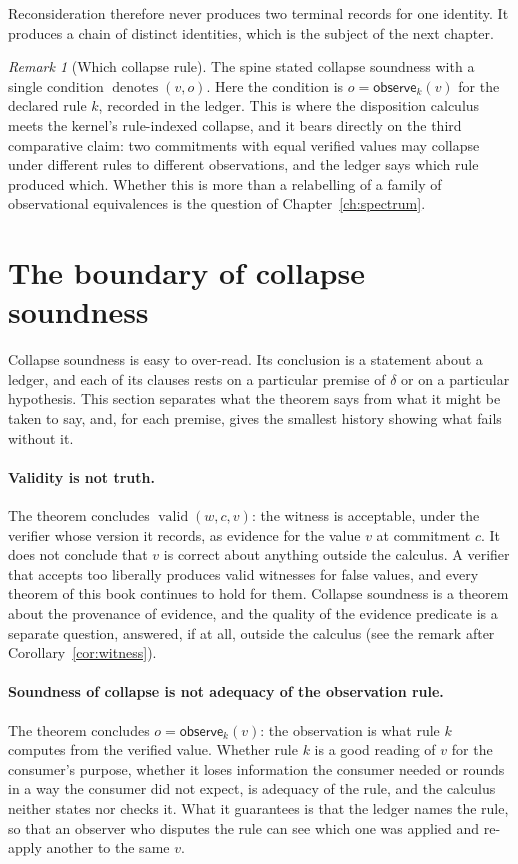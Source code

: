 \documentclass[11pt,openany]{book}
\theoremstyle{remark}
\newtheorem{remark}[theorem]{Remark}
\newcommand{\valid}{\operatorname{valid}}
\begin{document}
Reconsideration therefore never produces two terminal records for one
identity. It produces a chain of distinct identities, which is the subject
of the next chapter.

\begin{remark}[Which collapse rule]
The spine stated collapse soundness with a single condition
$\operatorname{denotes}(v,o)$. Here the condition is $o=\mathsf{observe}_k(v)$
for the declared rule $k$, recorded in the ledger. This is where the
disposition calculus meets the kernel's rule-indexed collapse, and it
bears directly on the third comparative claim: two commitments with equal
verified values may collapse under different rules to different
observations, and the ledger says which rule produced which. Whether this
is more than a relabelling of a family of observational equivalences is
the question of Chapter~\ref{ch:spectrum}.
\end{remark}

\section{The boundary of collapse soundness}

Collapse soundness is easy to over-read. Its conclusion is a statement
about a ledger, and each of its clauses rests on a particular premise of
$\delta$ or on a particular hypothesis. This section separates what the
theorem says from what it might be taken to say, and, for each premise,
gives the smallest history showing what fails without it.

\paragraph{Validity is not truth.} The theorem concludes $\valid(w,c,v)$:
the witness is acceptable, under the verifier whose version it records,
as evidence for the value $v$ at commitment $c$. It does not conclude that
$v$ is correct about anything outside the calculus. A verifier that
accepts too liberally produces valid witnesses for false values, and every
theorem of this book continues to hold for them. Collapse soundness is a
theorem about the provenance of evidence, and the quality of the evidence
predicate is a separate question, answered, if at all, outside the
calculus (see the remark after Corollary~\ref{cor:witness}).

\paragraph{Soundness of collapse is not adequacy of the observation
rule.} The theorem concludes $o=\mathsf{observe}_k(v)$: the observation is
what rule $k$ computes from the verified value. Whether rule $k$ is a good
reading of $v$ for the consumer's purpose, whether it loses information
the consumer needed or rounds in a way the consumer did not expect, is
adequacy of the rule, and the calculus neither states nor checks it. What
it guarantees is that the ledger names the rule, so that an observer who
disputes the rule can see which one was applied and re-apply another to
the same $v$.
\end{document}
